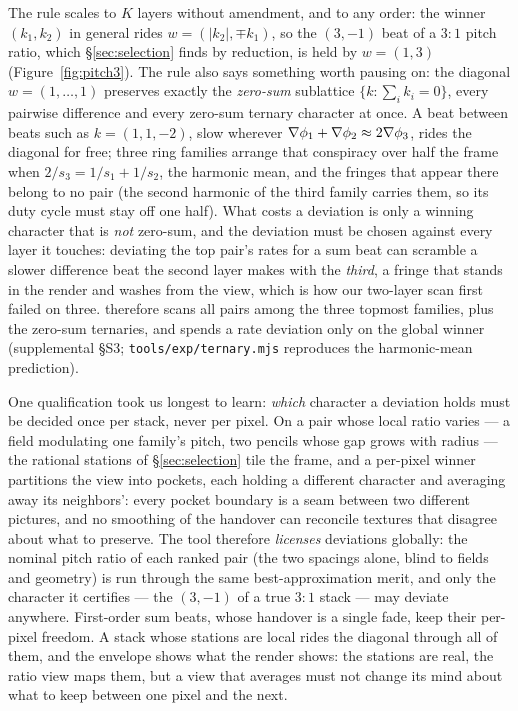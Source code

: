 The rule scales to $K$ layers without amendment, and to any order: the winner
$(k_1,k_2)$ in general rides $w=(\lvert k_2\rvert,\mp k_1)$, so the $(3,-1)$
beat of a $3{:}1$ pitch ratio, which \S\ref{sec:selection} finds by reduction,
is held by $w=(1,3)$ (Figure~\ref{fig:pitch3}). The rule also says something
worth pausing on: the diagonal $w=(1,\dots,1)$ preserves exactly the
\emph{zero-sum} sublattice $\{k:\sum_i k_i=0\}$, every pairwise difference
and every zero-sum ternary character at once. A beat between beats such as
$k=(1,1,-2)$, slow wherever $\nabla\phi_1+\nabla\phi_2\approx2\nabla\phi_3$,
rides the diagonal for free; three ring families arrange that conspiracy
over half the frame when $2/s_3=1/s_1+1/s_2$, the harmonic mean, and the
fringes that appear there belong to no pair (the second harmonic of the
third family carries them, so its duty cycle must stay off one half). What
costs a deviation is only a winning character that is \emph{not} zero-sum,
and the deviation must be chosen against every layer it touches: deviating
the top pair's rates for a sum beat can scramble a slower difference beat
the second layer makes with the \emph{third}, a fringe that stands in the
render and washes from the view, which is how our two-layer scan first
failed on three. \Moire{} therefore scans all pairs among the three topmost
families, plus the zero-sum ternaries, and spends a rate deviation only on
the global winner (supplemental \S S3;
\texttt{tools/exp/ternary.mjs} reproduces the harmonic-mean prediction).

One qualification took us longest to learn: \emph{which} character a
deviation holds must be decided once per stack, never per pixel. On a pair
whose local ratio varies --- a field modulating one family's pitch, two
pencils whose gap grows with radius --- the rational stations of
\S\ref{sec:selection} tile the frame, and a per-pixel winner partitions the
view into pockets, each holding a different character and averaging away
its neighbors': every pocket boundary is a seam between two different
pictures, and no smoothing of the handover can reconcile textures that
disagree about what to preserve. The tool therefore \emph{licenses}
deviations globally: the nominal pitch ratio of each ranked pair (the two
spacings alone, blind to fields and geometry) is run through the same
best-approximation merit, and only the character it certifies --- the
$(3,-1)$ of a true $3{:}1$ stack --- may deviate anywhere. First-order sum
beats, whose handover is a single fade, keep their per-pixel freedom. A
stack whose stations are local rides the diagonal through all of them, and
the envelope shows what the render shows: the stations are real, the ratio
view maps them, but a view that averages must not change its mind about
what to keep between one pixel and the next.

